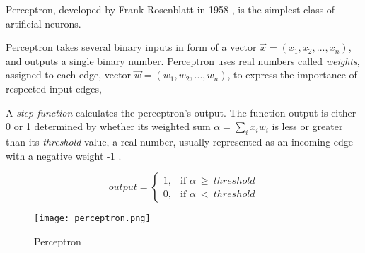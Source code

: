 Perceptron, developed by Frank Rosenblatt in 1958 \cite{perceptronprobabmodel}, is the simplest class of artificial neurons.

Perceptron takes several binary inputs in form of a vector $\vec{x} = (x_1, x_2,...,x_n)$, and outputs a single binary number. Perceptron uses real numbers called \textit{weights}, assigned to each edge, vector $\vec{w} = (w_1,w_2,...,w_n)$, to express the importance of respected input edges, 

A \textit{step function} calculates the perceptron's output.
The function output is either 0 or 1 determined by whether its weighted sum $\alpha = \sum_{i} x_i w_i$ is less or greater than its \textit{threshold} value, a real number, usually represented as an incoming edge with a negative weight -1 \cite{matous}.

\begin{equation}
    output =
\begin{cases}
    1, & \text{if $\alpha\ \geq\ threshold$}\\
    0, & \text{if $\alpha\ <\ threshold$}
\end{cases} 
\end{equation} 


\begin{figure}[h]
	\centering
    \texttt{[image: perceptron.png]}
	\caption{Perceptron \cite{matous}}
	\label{fig:perceptron}
\end{figure}
